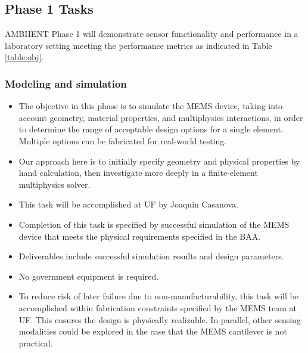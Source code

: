 \subsection{Phase 1 Tasks}

AMBIIENT Phase 1 will demonstrate sensor functionality and performance in a laboratory
setting meeting the performance metrics as indicated in Table \ref{table:obj}. 

\subsubsection{Modeling and simulation}\label{sec:p1:em}
\begin{itemize}
\item The objective in this phase is to simulate the MEMS device, taking into account geometry, material properties, and multiphysics interactions, in order to determine the range of acceptable design options for a single element. Multiple options can be fabricated for real-world testing. 
\item Our approach here is to initially specify geometry and physical properties by hand calculation, then investigate more deeply in a finite-element multiphysics solver.
\item This task will be accomplished at UF by Joaquin Casanova.
\item Completion of this task is specified by successful simulation of the MEMS device that meets the physical requirements specified in the BAA.
\item Deliverables include successful simulation results and design parameters.
\item No government equipment is required.
\item To reduce risk of later failure due to non-manufacturability, this task will be accomplished within fabrication constraints specified by the MEMS team at UF. This ensures the design is physically realizable. In parallel, other sensing modalities could be explored in the case that the MEMS cantilever is not practical.
\end{itemize}
